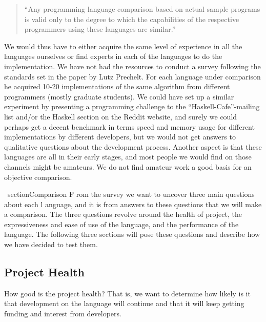 \begin{quote}
  ``Any programming language comparison based on actual sample programs
  is valid only to the degree to which the capabilities of the
  respective programmers using these languages are similar.''
\end{quote}

We would thus have to either acquire the same level of experience in all the
languages ourselves or find experts in each of the languages to do the
implementation. We have not had the resources to conduct a survey
following the standards set in the paper by Lutz Prechelt. For each
language under comparison he acquired 10-20 implementations of the
same algorithm from different programmers (mostly graduate
students). We could have set up a similar experiment by presenting a
programming challenge to the ``Haskell-Cafe''-mailing list and/or the
Haskell section on the Reddit website, and surely we could perhaps get
a decent benchmark in terms speed and memory usage for different
implementations by different developers, but we would not get answers
to qualitative questions about the development process. Another aspect
is that these languages are all in their early stages, and most people
we would find on those channels might be amateurs. We do not find
amateur work a good basis for an objective comparison.


\ section{Comparison}
F rom the survey we want to uncover three main questions about each
l anguage, and it is from answers to these questions that we will make
a  comparison. The three questions revolve around the health of
project, the expressiveness and ease of use of the language, and the
performance of the language. The following three sections will pose
these questions and describe how we have decided to test them.


\subsection{Project Health}
How good is the project health? That is,
we want to determine how likely is it that development on the language
will continue and that it will keep getting funding and interest from
developers.

